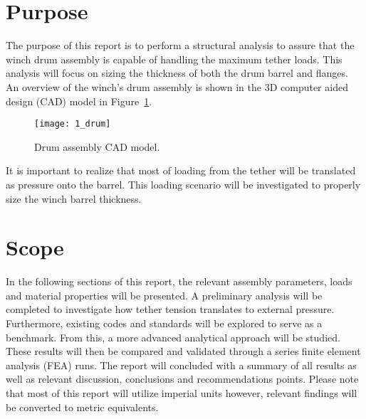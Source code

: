 \section{Purpose}

The purpose of this report is to perform a structural analysis to assure that the winch drum assembly is capable of handling the maximum tether loads. This analysis will focus on sizing the thickness of both the drum barrel and flanges.\\

An overview of the winch's drum assembly is shown in the 3D computer aided design (CAD) model \cite{INVENTOR} in Figure~\ref{fig:1_drum}.
\begin{figure}[H]
	\centering
	\texttt{[image: 1\_drum]}
	\caption{Drum assembly CAD model.}
	\label{fig:1_drum}
\end{figure}

It is important to realize that most of loading from the tether will be translated as pressure onto the barrel. This loading scenario will be investigated to properly size the winch barrel thickness.

\section{Scope}

In the following sections of this report, the relevant assembly parameters, loads and material properties will be presented. A preliminary analysis will be completed to investigate how tether tension translates to external pressure. Furthermore, existing codes and standards will be explored to serve as a benchmark. From this, a more advanced analytical approach will be studied. These results will then be compared and validated through a series finite element analysis (FEA) runs. The report will concluded with a summary of all results as  well as relevant discussion, conclusions and recommendations points. Please note that most of this report will utilize imperial units however, relevant findings will be converted to metric equivalents.